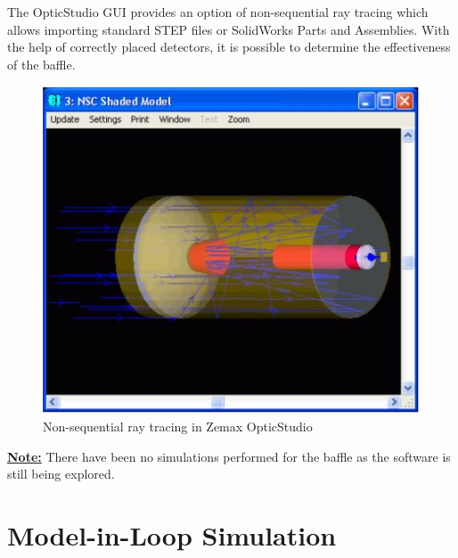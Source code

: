 \documentclass[../../main.tex]{subfiles}
\begin{document}
\par
The OpticStudio GUI provides an option of non-sequential ray tracing which allows importing standard STEP files or SolidWorks Parts and Assemblies. With the help of correctly placed detectors, it is possible to determine the effectiveness of the baffle.

\begin{figure}[H]
    \centering
    \includegraphics{Figures/Instrumentation/non_sequential_component.JPG}
    \caption{Non-sequential ray tracing in Zemax OpticStudio}
    \label{fig:12.6} 
\end{figure}
\par
\textbf{\underline{Note:}} There have been no simulations performed for the baffle as the software is still being explored.


\section{Model-in-Loop Simulation}
\blindtext
\end{document}
